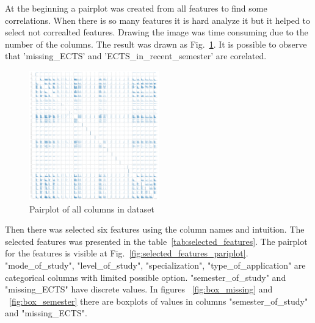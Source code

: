 
At the beginning a pairplot was created from all features to find some correlations. When there is so many features it is hard analyze it but it helped to select not correalted features. Drawing the image was time consuming due to the number of the columns. The result was drawn as Fig.~\ref{fig:all_features_pariplot}. It is possible to observe that 'missing\_ECTS' and 'ECTS\_in\_recent\_semester' are corelated.


\begin{figure}
    \includegraphics[width=0.5\textwidth]{img/pairplot.png}
    \caption{Pairplot of all columns in dataset}
    \label{fig:all_features_pariplot}
\end{figure}


Then there was selected six features using the column names and intuition. The selected features was presented in the table~\ref{tab:selected_features}. The pairplot for the features is visible at Fig.~\ref{fig:selected_features_pariplot}.
"mode\_of\_study", "level\_of\_study", "specialization", "type\_of\_application" are categorical columns with limited possible option. "semester\_of\_study" and "missing\_ECTS" have discrete values. In figures ~\ref{fig:box_missing} and ~\ref{fig:box_semester} there are boxplots of values in columns "semester\_of\_study" and "missing\_ECTS".

